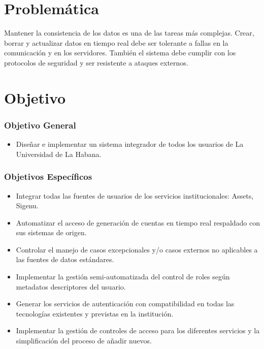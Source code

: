 \section*{Problemática}
Mantener la consistencia de los datos es una de las tareas m\'as complejas. Crear, borrar y actualizar  datos en tiempo real debe ser tolerante a fallas en la comunicaci\'on y en los servidores. Tambi\'en el sistema debe cumplir con los protocolos de seguridad y ser resistente a ataques externos.

\section*{Objetivo}

\subsubsection*{Objetivo General}

\begin{itemize}	
	\item Diseñar e implementar un sistema integrador de todos los usuarios de La Universidad de La Habana. 
\end{itemize}

\subsubsection*{Objetivos Específicos}
\begin{itemize}	
	\item Integrar todas las fuentes de usuarios de los servicios institucionales: Assets, Sigenu.
	\item Automatizar el acceso de generación de cuentas en tiempo real respaldado con sus sistemas de origen.
	\item Controlar el manejo de casos excepcionales y/o casos externos no aplicables a las fuentes de datos estándares.
	\item Implementar la gestión semi-automatizada del control de roles según metadatos descriptores del usuario.
	\item Generar los servicios de autenticación con compatibilidad en todas las tecnologías existentes y previstas en la institución.
	\item Implementar la gestión de controles de acceso para los diferentes servicios y la simplificación del proceso de añadir nuevos.
\end{itemize}